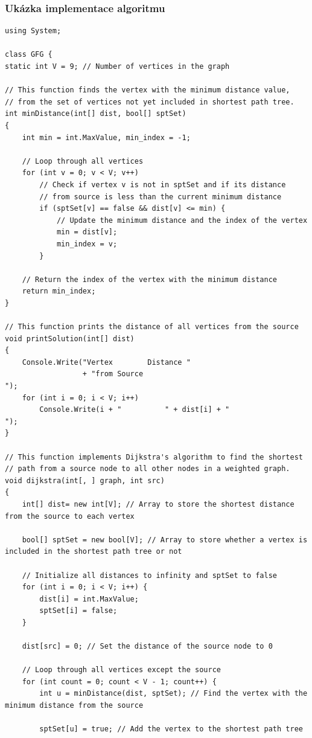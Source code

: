 \documentclass[12pt, titlepage, a4paper]{article}
\begin{document}
\subsubsection{Ukázka implementace algoritmu}
\begin{lstlisting}
using System;

class GFG {
static int V = 9; // Number of vertices in the graph

// This function finds the vertex with the minimum distance value,
// from the set of vertices not yet included in shortest path tree.
int minDistance(int[] dist, bool[] sptSet)
{
    int min = int.MaxValue, min_index = -1;

    // Loop through all vertices
    for (int v = 0; v < V; v++)
        // Check if vertex v is not in sptSet and if its distance
        // from source is less than the current minimum distance
        if (sptSet[v] == false && dist[v] <= min) {
            // Update the minimum distance and the index of the vertex
            min = dist[v];
            min_index = v;
        }

    // Return the index of the vertex with the minimum distance
    return min_index;
}

// This function prints the distance of all vertices from the source
void printSolution(int[] dist)
{
    Console.Write("Vertex 		 Distance "
                  + "from Source
");
    for (int i = 0; i < V; i++)
        Console.Write(i + " 		 " + dist[i] + "
");
}

// This function implements Dijkstra's algorithm to find the shortest
// path from a source node to all other nodes in a weighted graph.
void dijkstra(int[, ] graph, int src)
{
    int[] dist= new int[V]; // Array to store the shortest distance from the source to each vertex

    bool[] sptSet = new bool[V]; // Array to store whether a vertex is included in the shortest path tree or not

    // Initialize all distances to infinity and sptSet to false
    for (int i = 0; i < V; i++) {
        dist[i] = int.MaxValue;
        sptSet[i] = false;
    }

    dist[src] = 0; // Set the distance of the source node to 0

    // Loop through all vertices except the source
    for (int count = 0; count < V - 1; count++) {
        int u = minDistance(dist, sptSet); // Find the vertex with the minimum distance from the source

        sptSet[u] = true; // Add the vertex to the shortest path tree


\end{lstlisting}
\end{document}
